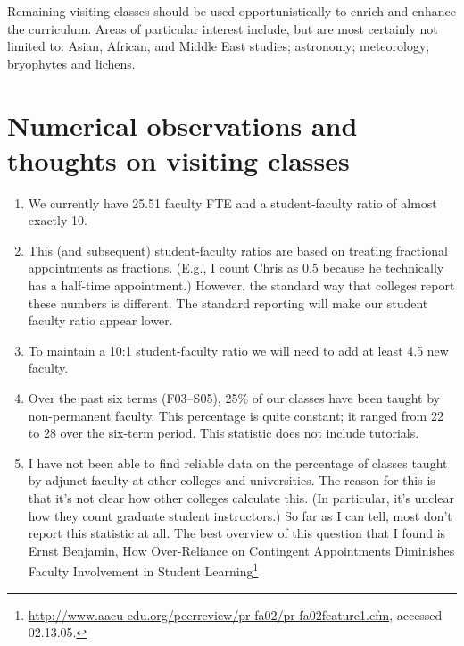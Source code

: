 \documentclass[12pt]{article}
\begin{document}
Remaining visiting classes should be used opportunistically to enrich
and enhance the curriculum.  Areas of particular interest include, but
are most certainly not limited to:  Asian, African, and Middle East
studies; astronomy; meteorology; bryophytes and lichens. 



\appendix

\section{Numerical observations and thoughts on visiting classes}
\label{numbers}

\begin{enumerate}
    \item We currently have 25.51 faculty FTE and a student-faculty
    ratio of almost exactly 10.

    \item This (and subsequent) student-faculty ratios are based on
    treating fractional appointments as fractions.  (E.g., I count
    Chris as 0.5 because he technically has a half-time appointment.)
    However, the standard way that colleges report these numbers is
    different.  The standard reporting will make our student faculty
    ratio appear lower.  

    \item To maintain a 10:1 student-faculty ratio we will need to add
    at least 4.5 new faculty.


    \item Over the past six terms (F03--S05), 25\% of our classes have
    been taught by non-permanent faculty.  This percentage is quite
    constant; it ranged from 22 to 28 over the six-term period.  This
    statistic does not include tutorials.  

    \item I have not been able to find reliable data on the
     percentage of classes taught by adjunct faculty at other
     colleges and universities.  The reason for this is that it's not
     clear how other colleges calculate this.  (In particular, it's
     unclear how they count graduate student instructors.)  So far as
     I can tell, most don't report this statistic at all.  The best
     overview of this question that I found is Ernst Benjamin, How
     Over-Reliance on Contingent Appointments Diminishes Faculty
     Involvement in Student Learning\footnote{
     {\url{http://www.aacu-edu.org/peerreview/pr-fa02/pr-fa02feature1.cfm}},
     accessed 02.13.05.} 


\end{enumerate}
\end{document}
